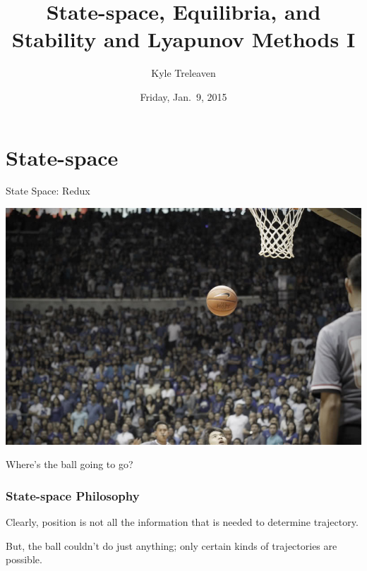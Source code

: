 \documentclass[12pt]{beamer}
\author{Kyle Treleaven}
\title{State-space, Equilibria, and Stability and Lyapunov Methods I}
\date{Friday, Jan.~9, 2015}
\begin{document}
\begin{frame}
\titlepage

\end{frame}





\section{State-space}


\begin{frame}
\vfill
\centering
{\Large State Space: Redux}
\vfill\null
\end{frame}


\begin{frame}
\centering
\vfill
\includegraphics[width=.6\linewidth]{pic/airball.jpg}

Where's the ball going to go?
\vfill\null
\end{frame}





\begin{frame}
\frametitle{State-space Philosophy}

\begin{itemize}

\vitem Clearly, position is not all the information that is needed to determine trajectory.

\vitem But, the ball couldn't do just anything; only certain kinds of trajectories are possible.

\end{itemize}

\vfill\null
\end{frame}
\end{document}
